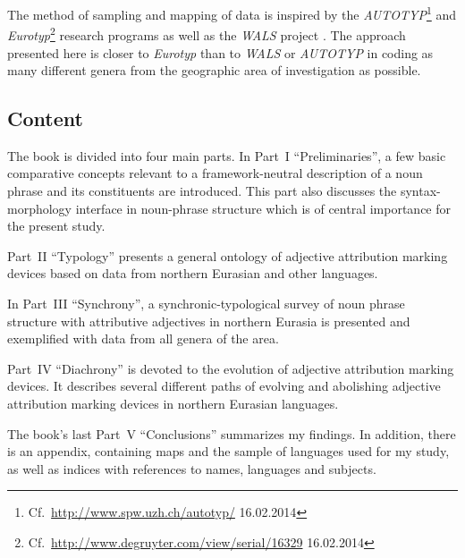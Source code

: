 The method of sampling and mapping of data is inspired by the \emph{AUTOTYP}\footnote{Cf.~\url{http://www.spw.uzh.ch/autotyp/} 16.02.2014} and \emph{Eurotyp}\footnote{Cf.~\url{http://www.degruyter.com/view/serial/16329} 16.02.2014} research programs as well as the \emph{WALS} project \citep{walsOnline2013}. The approach presented here is closer to \emph{Eurotyp} than to \emph{WALS} or \emph{AUTOTYP} in coding as many different genera from the geographic area of investigation as possible.

\subsection*{Content}
The book is divided into four main parts. In Part~I “Preliminaries”, a few basic comparative concepts relevant to a framework-neutral description of a noun phrase and its constituents are introduced. This part also discusses the syntax-morphology interface in noun-phrase structure which is of central importance for the present study.

Part~II “Typology” presents a general ontology of adjective attribution marking devices based on data from northern Eurasian and other languages.

In Part~III “Synchrony”, a synchronic-typological survey of noun phrase structure with attributive adjectives in northern Eurasia is presented and exemplified with data from all genera of the area.

Part~IV “Diachrony” is devoted to the evolution of adjective attribution marking devices. It describes several different paths of evolving and abolishing adjective attribution marking devices in northern Eurasian languages.

The book's last Part~V “Conclusions” summarizes my findings. In addition, there is an appendix, containing maps and the sample of languages used for my study, as well as indices with references to names, languages and subjects.
